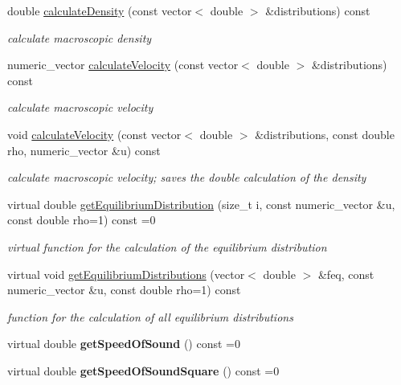 \begin{DoxyCompactItemize}
\item 
double \hyperlink{classnatrium_1_1BoltzmannModel_a9a96d883c99aa768d4153ea9a081776d}{calculate\-Density} (const vector$<$ double $>$ \&distributions) const 
\begin{DoxyCompactList}\small\item\em calculate macroscopic density \end{DoxyCompactList}\item 
numeric\-\_\-vector \hyperlink{classnatrium_1_1BoltzmannModel_acf451284cbf459e6d6d143adb53901cf}{calculate\-Velocity} (const vector$<$ double $>$ \&distributions) const 
\begin{DoxyCompactList}\small\item\em calculate macroscopic velocity \end{DoxyCompactList}\item 
void \hyperlink{classnatrium_1_1BoltzmannModel_ab2f5a72bd9eb54d0e134b94f109fa6b1}{calculate\-Velocity} (const vector$<$ double $>$ \&distributions, const double rho, numeric\-\_\-vector \&u) const 
\begin{DoxyCompactList}\small\item\em calculate macroscopic velocity; saves the double calculation of the density \end{DoxyCompactList}\item 
virtual double \hyperlink{classnatrium_1_1BoltzmannModel_ad482e26c4df3014e4b1447ee6cbb44ff}{get\-Equilibrium\-Distribution} (size\-\_\-t i, const numeric\-\_\-vector \&u, const double rho=1) const =0
\begin{DoxyCompactList}\small\item\em virtual function for the calculation of the equilibrium distribution \end{DoxyCompactList}\item 
virtual void \hyperlink{classnatrium_1_1BoltzmannModel_a3ca36ff192abe3b3fe07529d55e5be29}{get\-Equilibrium\-Distributions} (vector$<$ double $>$ \&feq, const numeric\-\_\-vector \&u, const double rho=1) const 
\begin{DoxyCompactList}\small\item\em function for the calculation of all equilibrium distributions \end{DoxyCompactList}\item 
\hypertarget{classnatrium_1_1BoltzmannModel_a309322c01514409cb2c29df1c287cb81}{virtual double {\bfseries get\-Speed\-Of\-Sound} () const =0}\label{classnatrium_1_1BoltzmannModel_a309322c01514409cb2c29df1c287cb81}

\item 
\hypertarget{classnatrium_1_1BoltzmannModel_a6ac22a5fa289299664271b6d0f86235a}{virtual double {\bfseries get\-Speed\-Of\-Sound\-Square} () const =0}\label{classnatrium_1_1BoltzmannModel_a6ac22a5fa289299664271b6d0f86235a}

\end{DoxyCompactItemize}



